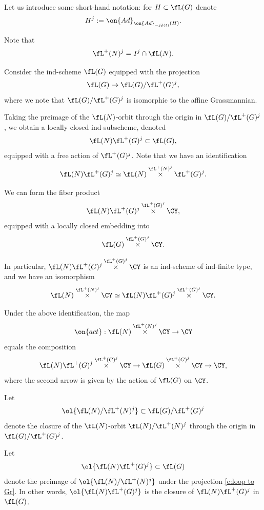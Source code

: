 \documentclass[9pt]{amsart}
\theoremstyle{definition}
\theoremstyle{remark}
\numberwithin{equation}{section}
\begin{document}


\sssec{}

Let us introduce some short-hand notation: for $H\subset \fL(G)$ denote
$$H^j:=\on{Ad}_{\on{Ad}_{-j\check\rho(t)}(H)}.$$

Note that
$$\fL^+(N)^j=I^j\cap \fL(N).$$

\medskip

Consider the ind-scheme $\fL(G)$ equipped with the projection
\begin{equation} \label{e:loop to Gr}
\fL(G)\to \fL(G)/\fL^+(G)^j,
\end{equation}
where we note that $\fL(G)/\fL^+(G)^j$ is isomorphic to the affine Grassmannian.

\medskip

Taking the preimage of the $\fL(N)$-orbit through the origin in $\fL(G)/\fL^+(G)^j$, we obtain
a locally closed ind-subscheme, denoted
$$\fL(N)\fL^+(G)^j\subset \fL(G),$$
equipped with a free action of $\fL^+(G)^j$. Note that we have an identification
$$\fL(N)\fL^+(G)^j\simeq \fL(N)\overset{\fL^+(N)^j}\times \fL^+(G)^j.$$

\medskip

We can form the fiber product
$$\fL(N)\fL^+(G)^j \overset{\fL^+(G)^j}\times \CY,$$
equipped with a locally closed embedding into 
$$\fL(G)\overset{\fL^+(G)^j}\times \CY.$$

In particular, $\fL(N)\fL^+(G)^j \overset{\fL^+(G)^j}\times \CY$ is 
an ind-scheme of ind-finite type, and we have an isomorphism 
$$\fL(N) \overset{\fL^+(N)^j}\times \CY\simeq \fL(N)\fL^+(G)^j \overset{\fL^+(G)^j}\times \CY.$$

\medskip

Under the above identification, the map
$$\on{act}:\fL(N) \overset{\fL^+(N)^j}\times \CY\to \CY$$
equals the composition
$$\fL(N)\fL^+(G)^j \overset{\fL^+(G)^j}\times \CY\to \fL(G)\overset{\fL^+(G)^j}\times \CY\to \CY,$$
where the second arrow is given by the action of $\fL(G)$ on $\CY$. 

\sssec{}

Let 
$$\ol{\fL(N)/\fL^+(N)^j}\subset \fL(G)/\fL^+(G)^j$$
denote the closure of the $\fL(N)$-orbit $\fL(N)/\fL^+(N)^j$ through the origin in $\fL(G)/\fL^+(G)^j$.

\medskip

Let 
$$\ol{\fL(N)\fL^+(G)^j}\subset \fL(G)$$
denote the preimage of $\ol{\fL(N)/\fL^+(N)^j}$ under the projection \eqref{e:loop to Gr}. In other words,
$\ol{\fL(N)\fL^+(G)^j}$ is the closure of $\fL(N)\fL^+(G)^j$ in $\fL(G)$. 
\end{document}
